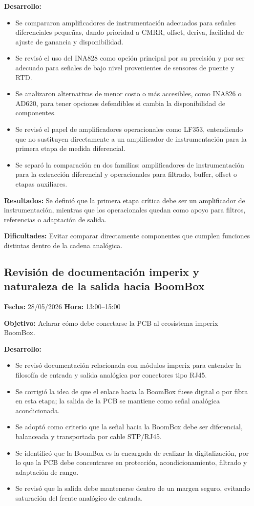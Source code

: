 \documentclass[12pt]{article}
\begin{document}
\textbf{Desarrollo:}
\begin{itemize}
\item Se compararon amplificadores de instrumentación adecuados para señales diferenciales pequeñas, dando prioridad a CMRR, offset, deriva, facilidad de ajuste de ganancia y disponibilidad.
\item Se revisó el uso del INA828 como opción principal por su precisión y por ser adecuado para señales de bajo nivel provenientes de sensores de puente y RTD.
\item Se analizaron alternativas de menor costo o más accesibles, como INA826 o AD620, para tener opciones defendibles si cambia la disponibilidad de componentes.
\item Se revisó el papel de amplificadores operacionales como LF353, entendiendo que no sustituyen directamente a un amplificador de instrumentación para la primera etapa de medida diferencial.
\item Se separó la comparación en dos familias: amplificadores de instrumentación para la extracción diferencial y operacionales para filtrado, buffer, offset o etapas auxiliares.
\end{itemize}

\textbf{Resultados:}
Se definió que la primera etapa crítica debe ser un amplificador de instrumentación, mientras que los operacionales quedan como apoyo para filtros, referencias o adaptación de salida.

\textbf{Dificultades:}
Evitar comparar directamente componentes que cumplen funciones distintas dentro de la cadena analógica.

\subsection{Revisión de documentación imperix y naturaleza de la salida hacia BoomBox}
\textbf{Fecha:} 28/05/2026 \quad \textbf{Hora:} 13:00--15:00

\textbf{Objetivo:}
Aclarar cómo debe conectarse la PCB al ecosistema imperix BoomBox.

\textbf{Desarrollo:}
\begin{itemize}
\item Se revisó documentación relacionada con módulos imperix para entender la filosofía de entrada y salida analógica por conectores tipo RJ45.
\item Se corrigió la idea de que el enlace hacia la BoomBox fuese digital o por fibra en esta etapa; la salida de la PCB se mantiene como señal analógica acondicionada.
\item Se adoptó como criterio que la señal hacia la BoomBox debe ser diferencial, balanceada y transportada por cable STP/RJ45.
\item Se identificó que la BoomBox es la encargada de realizar la digitalización, por lo que la PCB debe concentrarse en protección, acondicionamiento, filtrado y adaptación de rango.
\item Se revisó que la salida debe mantenerse dentro de un margen seguro, evitando saturación del frente analógico de entrada.
\end{itemize}
\end{document}
